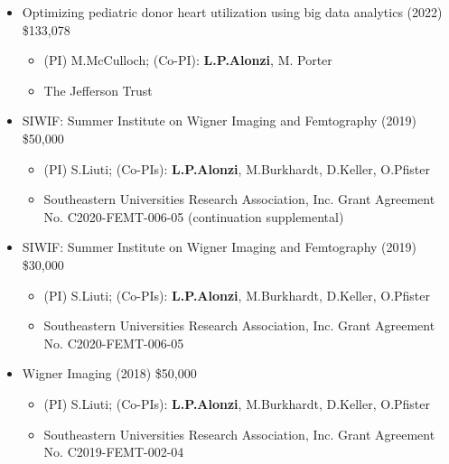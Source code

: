 \documentclass[10pt]{article}
\begin{document}
\begin{itemize}
\item Optimizing pediatric donor heart utilization using big data analytics (2022) \$133,078
\begin{itemize}
\item (PI) M.McCulloch; (Co-PI): {\bf L.P.Alonzi}, M. Porter
\item The Jefferson Trust
\end{itemize}
\item SIWIF: Summer Institute on Wigner Imaging and Femtography (2019) \$50,000
\begin{itemize}
\item (PI) S.Liuti; (Co-PIs): {\bf L.P.Alonzi}, M.Burkhardt, D.Keller, O.Pfister
\item Southeastern Universities Research Association, Inc. Grant Agreement No. C2020-FEMT-006-05 (continuation supplemental)
\end{itemize}
\item SIWIF: Summer Institute on Wigner Imaging and Femtography (2019) \$30,000
\begin{itemize}
\item (PI) S.Liuti; (Co-PIs): {\bf L.P.Alonzi}, M.Burkhardt, D.Keller, O.Pfister
\item Southeastern Universities Research Association, Inc. Grant Agreement No. C2020-FEMT-006-05
\end{itemize}
\end{itemize}

\begin{itemize}
\item Wigner Imaging (2018) \$50,000
\begin{itemize}
\item (PI) S.Liuti; (Co-PIs): {\bf L.P.Alonzi}, M.Burkhardt, D.Keller, O.Pfister
\item Southeastern Universities Research Association, Inc. Grant Agreement No. C2019-FEMT-002-04
\end{itemize}
\end{itemize}
\end{document}
